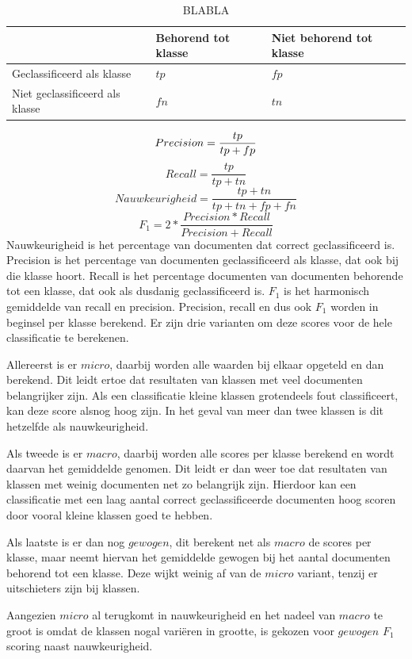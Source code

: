 \begin{table}[H]
\caption{BLABLA}
\label{tab:scores}
\centering
\begin{tabular}{l|l|l}
 & Behorend tot klasse & Niet behorend tot klasse\\ \hline
Geclassificeerd als klasse &   $tp$ & $fp$ \\ \hline
Niet geclassificeerd als klasse & $fn$ & $tn$ \\
\end{tabular}
\end{table}
\begin{equation}
    Precision = \frac{tp}{tp + fp}\\
\end{equation}
\begin{equation}
    Recall = \frac{tp}{tp + tn}
\end{equation}
\begin{equation}
    Nauwkeurigheid = \frac{tp + tn}{tp + tn + fp + fn}
\end{equation}
\begin{equation}
    F_1 = 2 * \frac{Precision * Recall}{Precision + Recall}
\end{equation}
Nauwkeurigheid is het percentage van documenten dat correct geclassificeerd is. Precision is het percentage van documenten geclassificeerd als klasse, dat ook bij die klasse hoort. Recall is het percentage documenten van documenten behorende tot een klasse, dat ook als dusdanig geclassificeerd is. $F_1$ is het harmonisch gemiddelde van recall en precision. Precision, recall en dus ook $F_1$ worden in beginsel per klasse berekend. Er zijn drie varianten om deze scores voor de hele classificatie te berekenen. \par
Allereerst is er $micro$, daarbij worden alle waarden bij elkaar opgeteld en dan berekend. Dit leidt ertoe dat resultaten van klassen met veel documenten belangrijker zijn. Als een classificatie kleine klassen grotendeels fout classificeert, kan deze score alsnog hoog zijn. In het geval van meer dan twee klassen is dit hetzelfde als nauwkeurigheid.\par 
Als tweede is er $macro$, daarbij worden alle scores per klasse berekend en wordt daarvan het gemiddelde genomen. Dit leidt er dan weer toe dat resultaten van klassen met weinig documenten net zo belangrijk zijn. Hierdoor kan een classificatie met een laag aantal correct geclassificeerde documenten hoog scoren door vooral kleine klassen goed te hebben.\par
Als laatste is er dan nog $gewogen$, dit berekent net als $macro$ de scores per klasse, maar neemt hiervan het gemiddelde gewogen bij het aantal documenten behorend tot een klasse. Deze wijkt weinig af van de $micro$ variant, tenzij er uitschieters zijn bij klassen.\par
Aangezien $micro$ al terugkomt in nauwkeurigheid en het nadeel van $macro$ te groot is omdat de klassen nogal variëren in grootte, is gekozen voor $gewogen$ $F_1$ scoring naast nauwkeurigheid.
\bigskip

